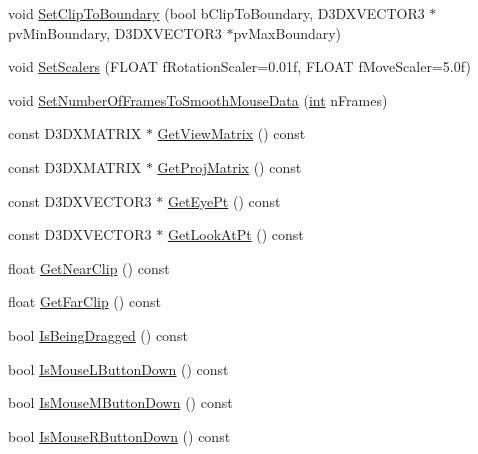 \begin{DoxyCompactItemize}
\item 
void \hyperlink{class_c_base_camera_a5e3ec99a05164a281f55a812b755a6da}{SetClipToBoundary} (bool bClipToBoundary, D3DXVECTOR3 $\ast$pvMinBoundary, D3DXVECTOR3 $\ast$pvMaxBoundary)
\item 
void \hyperlink{class_c_base_camera_a33c8df00f0f8d644744621ac7142d5f8}{SetScalers} (FLOAT fRotationScaler=0.01f, FLOAT fMoveScaler=5.0f)
\item 
void \hyperlink{class_c_base_camera_a7cda8d85d13b016697b4c4e27d57e41c}{SetNumberOfFramesToSmoothMouseData} (\hyperlink{_d_x_u_tgui_8cpp_a2d77ed03302b6978834ee3b6f57837fb}{int} nFrames)
\item 
const D3DXMATRIX $\ast$ \hyperlink{class_c_base_camera_a10c93bd976787aec5b71daecd3448047}{GetViewMatrix} () const 
\item 
const D3DXMATRIX $\ast$ \hyperlink{class_c_base_camera_abd1fd54b7481f136ff160528caac139a}{GetProjMatrix} () const 
\item 
const D3DXVECTOR3 $\ast$ \hyperlink{class_c_base_camera_ae08632cf51cc263cdd2d78eea8af442a}{GetEyePt} () const 
\item 
const D3DXVECTOR3 $\ast$ \hyperlink{class_c_base_camera_a9b4df40fa4654c10205d15ff79376e77}{GetLookAtPt} () const 
\item 
float \hyperlink{class_c_base_camera_ab99c79000b2d4fbf59c181032bccb95d}{GetNearClip} () const 
\item 
float \hyperlink{class_c_base_camera_a381de0e1f449208b1c2cb86e462c8643}{GetFarClip} () const 
\item 
bool \hyperlink{class_c_base_camera_a3928806e81783b1b3138833585d5f5d0}{IsBeingDragged} () const 
\item 
bool \hyperlink{class_c_base_camera_a9b7c2e2595e2c7fff4afe8a92291feaf}{IsMouseLButtonDown} () const 
\item 
bool \hyperlink{class_c_base_camera_ae258726567f469b2e2bdbca54c3b9203}{IsMouseMButtonDown} () const 
\item 
bool \hyperlink{class_c_base_camera_a23062c3b30369799c572fdba7b61ef13}{IsMouseRButtonDown} () const 
\end{DoxyCompactItemize}
